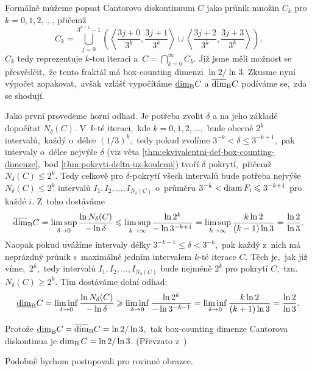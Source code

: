 \begin{example}\label{ex:cantorovo-diskontinuum}
    Formálně můžeme popsat Cantorovo diskontinuum $C$ jako průnik množin $C_k$ pro $k=0,1,2,\ldots$, přičemž
    \[C_k=\bigcup _{j=0}^{3^{k-1}-1}\left(\left\langle{\frac {3j+0}{3^{k}}},{\frac {3j+1}{3^{k}}}\right\rangle\cup \left\langle{\frac {3j+2}{3^{k}}},{\frac {3j+3}{3^{k}}}\right\rangle\right).\]
    $C_k$ tedy reprezentuje $k$-tou iteraci a~$C=\bigcap_{k=0}^\infty C_k$. Již jsme měli možnost se přesvědčit,~že tento fraktál má box-counting dimenzi $\ln{2}/\ln{3}$. Zkusme nyní výpočet zopakovat,~avšak vzlášť vypočítáme $\underline{\dim}_\textup{B}{C}$ a $\overline{\dim}_\textup{B}{C}$ podíváme se,~zda se shodují.

    Jako první provedeme horní odhad. Je potřeba zvolit $\delta$ a na jeho základě dopočítat $N_\delta(C)$. V~$k$-té iteraci,~kde $k=0,1,2,\ldots$,~bude obecně $2^k$ intervalů,~každý o~délce $(1/3)^k$,~tedy pokud zvolíme $3^{-k}<\delta\leqslant 3^{-k+1}$,~pak intervaly o~délce nejvýše $\delta$ (viz věta \ref{thm:ekvivalentni-def-box-counting-dimenze},~bod \ref{thm:pokryti-delta-uz-koulemi}) tvoří $\delta$ pokrytí,~přičemž $N_\delta(C)\leqslant 2^k$. Tedy celkově pro $\delta$-pokrytí všech intervalů bude potřeba nejvýše $N_\delta(C)\leqslant 2^k$ intervalů $I_1,I_2,\ldots,I_{N_\delta(C)}$ o~průměru $3^{-k}<\operatorname{diam}{F_i}\leqslant 3^{-k+1}$ pro každé $i$. Z~toho dostáváme
    \[\overline{\dim}_\textup{B}{C}=\limsup_{\delta\to 0}\dfrac{\ln{N_\delta(C)}}{-\ln{\delta}}\leqslant\limsup_{k\to\infty}\dfrac{\ln{2^k}}{-\ln{3^{-k+1}}}=\limsup_{k\to\infty}\dfrac{k\ln{2}}{(k-1)\ln{3}}=\dfrac{\ln{2}}{\ln{3}}.\]
    Naopak pokud uvážíme intervaly délky $3^{-k-1}\leqslant\delta<3^{-k}$,~pak každý z~nich má neprázdný průnik s~maximálně jedním intervalem $k$-té iterace $C$. Těch je,~jak již víme,~$2^k$,~tedy intervalů $I_1,I_2,\ldots,I_{N_\delta(C)}$ bude nejméně $2^k$ pro pokrytí $C$,~tzn. $N_\delta(C)\geqslant 2^k$. Tím dostáváme dolní odhad:
    \[\underline{\dim}_\textup{B}{C}=\liminf_{\delta\to 0}\dfrac{\ln{N_\delta(C)}}{-\ln{\delta}}\geqslant\liminf_{\delta\to 0}\dfrac{\ln{2^k}}{-\ln{3^{-k-1}}}=\liminf_{\delta\to 0}\dfrac{k\ln{2}}{(k+1)\ln{3}}=\dfrac{\ln{2}}{\ln{3}}.\]

    Protože $\underline{\dim}_\textup{B}{C}=\overline{\dim}_\textup{B}{C}=\ln{2}/\ln{3}$,~tak box-counting dimenze Cantorova diskontinua je $\operatorname{dim_B}{C}=\ln{2}/\ln{3}$. (Převzato z~\citep[str. 32]{Falconer2014})
\end{example}
Podobně bychom postupovali pro rovinné obrazce.
